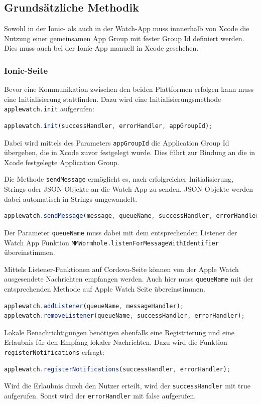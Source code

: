 \subsection{Grundsätzliche Methodik} 
%
Sowohl in der Ionic- als auch in der Watch-App muss innnerhalb von Xcode die Nutzung einer gemeinsamen App Group mit fester Group Id definiert werden. Dies muss auch bei der Ionic-App manuell in Xcode geschehen.
%
\subsubsection{Ionic-Seite}
%
Bevor eine Kommunikation zwischen den beiden Plattformen erfolgen kann muss eine Initialisierung stattfinden. Dazu wird eine Initialisierungsmethode \texttt{applewatch.init} aufgerufen:
\begin{lstlisting}[language=JavaScript]
applewatch.init(successHandler, errorHandler, appGroupId);
\end{lstlisting}
Dabei wird mittels des Parameters \texttt{appGroupId} die Application Group Id übergeben, die in Xcode zuvor festgelegt wurde. Dies führt zur Bindung an die in Xcode festgelegte Application Group.

Die Methode \texttt{sendMessage} ermöglicht es, nach erfolgreicher Initialisierung, Strings oder JSON-Objekte an die Watch App zu senden. JSON-Objekte werden dabei automatisch in Strings umgewandelt. 

\begin{lstlisting}[language=JavaScript]
applewatch.sendMessage(message, queueName, successHandler, errorHandler);
\end{lstlisting}
Der Parameter \texttt{queueName} muss dabei mit dem entsprechenden Listener der Watch App Funktion \texttt{MMWormhole.listenForMessageWithIdentifier} übereinstimmen. 

Mittels Listener-Funktionen auf Cordova-Seite können von der Apple Watch ausgesendete Nachrichten empfangen werden. Auch hier muss \texttt{queueName} mit der entsprechenden Methode auf Apple Watch Seite übereinstimmen.
\begin{lstlisting}[language=JavaScript]
applewatch.addListener(queueName, messageHandler);
applewatch.removeListener(queueName, successHandler, errorHandler);
\end{lstlisting}

Lokale Benachrichtigungen benötigen ebenfalls eine Registrierung und eine Erlaubnis für den Empfang lokaler Nachrichten. Dazu wird die Funktion \texttt{registerNotifications} erfragt:
\begin{lstlisting}[language=JavaScript]
applewatch.registerNotifications(successHandler, errorHandler);
\end{lstlisting}
Wird die Erlaubnis durch den Nutzer erteilt, wird der \texttt{successHandler} mit true aufgerufen. Sonst wird der \texttt{errorHandler} mit false aufgerufen.

